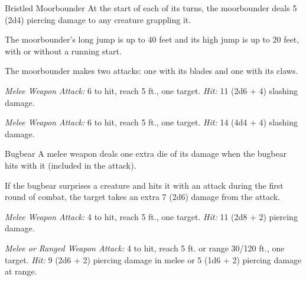 \documentclass[10pt,a4paper,twoside,bg=print,twocolumn,openany,nodeprecatedcode]{dndbook}
\begin{document}
\begin{DndMonster}[float=t]{Bristled Moorbounder}
\DndMonsterBasics[
armor-class = {15 (natural armor)},
hit-points = {\DndDice{7d10 + 14}},
speed = {70 ft.}
]
\DndMonsterAbilityScores[
 str = 18,
 dex = 14,
 con = 14,
 int = 2,
 wis = 13,
 cha = 5
]
\DndMonsterDetails[
senses = {darkvision 60 ft., passive perception 11},
challenge = 3,
]
At the start of each of its turns, the moorbounder deals 5 (2d4) piercing damage to any creature grappling it.

The moorbounder's long jump is up to 40 feet and its high jump is up to 20 feet, with or without a running start.

The moorbounder makes two attacks: one with its blades and one with its claws.

\textsl{Melee Weapon Attack:} 6 to hit, reach 5 ft., one target. \textsl{Hit:} 11 (2d6 + 4) slashing damage.

\textsl{Melee Weapon Attack:} 6 to hit, reach 5 ft., one target. \textsl{Hit:} 14 (4d4 + 4) slashing damage.

\end{DndMonster}



\begin{DndMonster}[float=t]{Bugbear}
\DndMonsterBasics[
armor-class = {16 (\textit{hide armor})},
hit-points = {\DndDice{5d8 + 5}},
speed = {30 ft.}
]
\DndMonsterAbilityScores[
 str = 15,
 dex = 14,
 con = 13,
 int = 8,
 wis = 11,
 cha = 9
]
\DndMonsterDetails[
skills = {Stealth +6, Survival +2},
senses = {darkvision 60 ft., passive perception 10},
languages = {Common, Goblin},
challenge = 1,
]
A melee weapon deals one extra die of its damage when the bugbear hits with it (included in the attack).

If the bugbear surprises a creature and hits it with an attack during the first round of combat, the target takes an extra 7 (2d6) damage from the attack.

\textsl{Melee Weapon Attack:} 4 to hit, reach 5 ft., one target. \textsl{Hit:} 11 (2d8 + 2) piercing damage.

\textsl{Melee or Ranged Weapon Attack:} 4 to hit, reach 5 ft. or range 30/120 ft., one target. \textsl{Hit:} 9 (2d6 + 2) piercing damage in melee or 5 (1d6 + 2) piercing damage at range.

\end{DndMonster}
\end{document}
